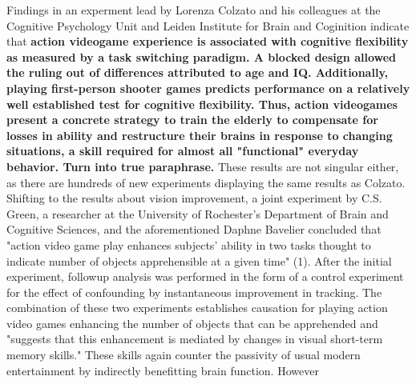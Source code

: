 \documentclass[12pt]{article}
\begin{document}
\begin{flushleft}
Findings in an experment lead by Lorenza Colzato and his colleagues at the Cognitive Psychology Unit and Leiden Institute for Brain and Coginition indicate that \textbf{action videogame experience is associated with cognitive flexibility as measured by a task switching paradigm. A blocked design allowed the ruling out of differences attributed to age and IQ. Additionally, playing first-person shooter games predicts performance on a relatively well established test for cognitive flexibility. Thus, action videogames present a concrete strategy to train the elderly to compensate for losses in ability and restructure their brains in response to changing situations, a skill required for almost all "functional" everyday behavior. Turn into true paraphrase.} These results are not singular either, as there are hundreds of new experiments displaying the same results as Colzato. Shifting to the results about vision improvement, a joint experiment by C.S. Green, a researcher at the University of Rochester's Department of Brain and Cognitive Sciences, and the aforementioned Daphne Bavelier concluded that "action video game play enhances subjects' ability in two tasks thought to indicate number of objects apprehensible at a given time" (1). After the initial experiment, followup analysis was performed in the form of a control experiment for the effect of confounding by instantaneous improvement in tracking. The combination of these two experiments establishes causation for playing action video games enhancing the number of objects that can be apprehended and "suggests that this enhancement is mediated by changes in visual short-term memory skills." These skills again counter the passivity of usual modern entertainment by indirectly benefitting brain function. However

\end{flushleft}
\end{document}

